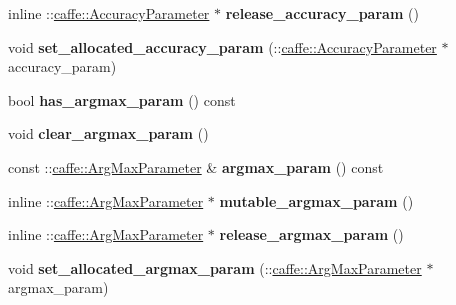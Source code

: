 \begin{DoxyCompactItemize}
inline \+::\mbox{\hyperlink{classcaffe_1_1_accuracy_parameter}{caffe\+::\+Accuracy\+Parameter}} $\ast$ {\bfseries release\+\_\+accuracy\+\_\+param} ()
\item 
\mbox{\label{classcaffe_1_1_v1_layer_parameter_a4bb886ffb8904530066e1a8653a4bc1c}} 
void {\bfseries set\+\_\+allocated\+\_\+accuracy\+\_\+param} (\+::\mbox{\hyperlink{classcaffe_1_1_accuracy_parameter}{caffe\+::\+Accuracy\+Parameter}} $\ast$accuracy\+\_\+param)
\item 
\mbox{\label{classcaffe_1_1_v1_layer_parameter_a58356877ae7fff8921ff277339d2d6a0}} 
bool {\bfseries has\+\_\+argmax\+\_\+param} () const
\item 
\mbox{\label{classcaffe_1_1_v1_layer_parameter_a48cb90d07126bdc999b8f84f140d63d2}} 
void {\bfseries clear\+\_\+argmax\+\_\+param} ()
\item 
\mbox{\label{classcaffe_1_1_v1_layer_parameter_a4d93da28e468e0a67b3863844857475f}} 
const \+::\mbox{\hyperlink{classcaffe_1_1_arg_max_parameter}{caffe\+::\+Arg\+Max\+Parameter}} \& {\bfseries argmax\+\_\+param} () const
\item 
\mbox{\label{classcaffe_1_1_v1_layer_parameter_a728f8f4cd2eb5aab833eb01ff7ca86aa}} 
inline \+::\mbox{\hyperlink{classcaffe_1_1_arg_max_parameter}{caffe\+::\+Arg\+Max\+Parameter}} $\ast$ {\bfseries mutable\+\_\+argmax\+\_\+param} ()
\item 
\mbox{\label{classcaffe_1_1_v1_layer_parameter_af5394eb26ba5ea916d1bb267e5669c9d}} 
inline \+::\mbox{\hyperlink{classcaffe_1_1_arg_max_parameter}{caffe\+::\+Arg\+Max\+Parameter}} $\ast$ {\bfseries release\+\_\+argmax\+\_\+param} ()
\item 
\mbox{\label{classcaffe_1_1_v1_layer_parameter_a31404ab6c62bb45844cc0d85655d8968}} 
void {\bfseries set\+\_\+allocated\+\_\+argmax\+\_\+param} (\+::\mbox{\hyperlink{classcaffe_1_1_arg_max_parameter}{caffe\+::\+Arg\+Max\+Parameter}} $\ast$argmax\+\_\+param)
\item 
\mbox{\label{classcaffe_1_1_v1_layer_parameter_a34f8f08369ad468805649fd80bc39796}} 

\end{DoxyCompactItemize}
